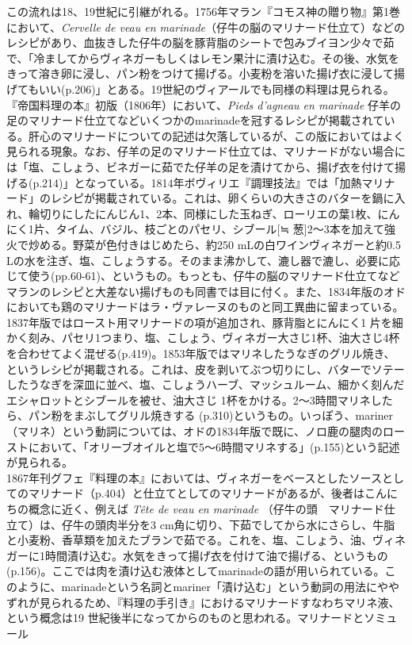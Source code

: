 {{{{  この流れは18、19世紀に引継がれる。1756年マラン『コモス神の贈り物』第1巻において、\emph{Cervelle
  de veau en
  marinade}（仔牛の脳のマリナード仕立て）などのレシピがあり、血抜きした仔牛の脳を豚背脂のシートで包みブイヨン少々で茹で、「冷ましてからヴィネガーもしくはレモン果汁に漬け込む。その後、水気をきって溶き卵に浸し、パン粉をつけて揚げる。小麦粉を溶いた揚げ衣に浸して揚げてもいい(p.206)」とある。19世紀のヴィアールでも同様の料理は見られる。『帝国料理の本』初版（1806年）において、\emph{Pieds
  d'agneau en marinade}
  仔羊の足のマリナード仕立てなどいくつかのmarinadeを冠するレシピが掲載されている。肝心のマリナードについての記述は欠落しているが、この版においてはよく見られる現象。なお、仔羊の足のマリナード仕立ては、マリナードがない場合には「塩、こしょう、ビネガーに茹でた仔羊の足を漬けてから、揚げ衣を付けて揚げる(p.214)」となっている。1814年ボヴィリエ『調理技法』では「加熱マリナード」のレシピが掲載されている。これは、卵くらいの大きさのバターを鍋に入れ、輪切りにしたにんじん1、2本、同様にした玉ねぎ、ローリエの葉1枚、にんにく1片、タイム、バジル、枝ごとのパセリ、シブール{[}≒
  葱{]}2〜3本を加えて強火で炒める。野菜が色付きはじめたら、約250
  mLの白ワインヴィネガーと約0.5
  Lの水を注ぎ、塩、こしょうする。そのまま沸かして、漉し器で漉し、必要に応じて使う(pp.60-61)、というもの。もっとも、仔牛の脳のマリナード仕立てなどマランのレシピと大差ない揚げものも同書では目に付く。また、1834年版のオドにおいても鶏のマリナードはラ・ヴァレーヌのものと同工異曲に留まっている。\\
  1837年版ではロースト用マリナードの項が追加され、豚背脂とにんにく1
  片を細かく刻み、パセリ1つまり、塩、こしょう、ヴィネガー大さじ1杯、油大さじ4杯を合わせてよく混ぜる(p.419)。1853年版ではマリネしたうなぎのグリル焼き、というレシピが掲載される。これは、皮を剥いてぶつ切りにし、バターでソテーしたうなぎを深皿に並べ、塩、こしょうハーブ、マッシュルーム、細かく刻んだエシャロットとシブールを被せ、油大さじ
  1杯をかける。2〜3時間マリネしたら、パン粉をまぶしてグリル焼きする
  (p.310)というもの。いっぽう、mariner（マリネ）という動詞については、オドの1834年版で既に、ノロ鹿の腿肉のローストにおいて、「オリーブオイルと塩で5〜6時間マリネする」(p.155)という記述が見られる。\\
  1867年刊グフェ『料理の本』においては、ヴィネガーをベースとしたソースとしてのマリナード（p.404）と仕立てとしてのマリナードがあるが、後者はこんにちの概念に近く、例えば
  \emph{Tête de veau en marinade}
  （仔牛の頭　マリナード仕立て）は、仔牛の頭肉半分を3
  cm角に切り、下茹でしてから水にさらし、牛脂と小麦粉、香草類を加えたブランで茹でる。これを、塩、こしょう、油、ヴィネガーに1時間漬け込む。水気をきって揚げ衣を付けて油で揚げる、というもの(p.156)。ここでは肉を漬け込む液体としてmarinadeの語が用いられている。このように、marinadeという名詞とmariner「漬け込む」という動詞の用法にややずれが見られるため、『料理の手引き』におけるマリナードすなわちマリネ液、という概念は19
  世紀後半になってからのものと思われる。}}{マリナードとソミュール}}\label{marinades-et-saumures}}

